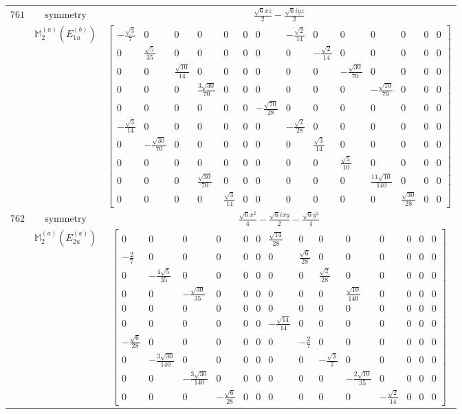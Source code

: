 \documentclass[fleqn,8pt,landscape]{jsarticle}
\begin{document}
\begin{longtable}{ccc}
$ 761 $ & $ \text{symmetry} $ & $ \frac{\sqrt{6} x z}{2} - \frac{\sqrt{6} i y z}{2} $ \\
$  $ & $ \mathbb{M}_{2}^{(a)}(E_{1u}^{(b)}) $ & $ \begin{bmatrix} - \frac{\sqrt{3}}{7} & 0 & 0 & 0 & 0 & 0 & 0 & - \frac{\sqrt{2}}{14} & 0 & 0 & 0 & 0 & 0 & 0 \\ 0 & \frac{\sqrt{5}}{35} & 0 & 0 & 0 & 0 & 0 & 0 & - \frac{\sqrt{2}}{14} & 0 & 0 & 0 & 0 & 0 \\ 0 & 0 & \frac{\sqrt{10}}{14} & 0 & 0 & 0 & 0 & 0 & 0 & - \frac{\sqrt{30}}{70} & 0 & 0 & 0 & 0 \\ 0 & 0 & 0 & \frac{3 \sqrt{30}}{70} & 0 & 0 & 0 & 0 & 0 & 0 & - \frac{\sqrt{10}}{70} & 0 & 0 & 0 \\ 0 & 0 & 0 & 0 & 0 & 0 & - \frac{\sqrt{70}}{28} & 0 & 0 & 0 & 0 & 0 & 0 & 0 \\ - \frac{\sqrt{3}}{14} & 0 & 0 & 0 & 0 & 0 & 0 & - \frac{\sqrt{2}}{28} & 0 & 0 & 0 & 0 & 0 & 0 \\ 0 & - \frac{\sqrt{30}}{70} & 0 & 0 & 0 & 0 & 0 & 0 & \frac{\sqrt{3}}{14} & 0 & 0 & 0 & 0 & 0 \\ 0 & 0 & 0 & 0 & 0 & 0 & 0 & 0 & 0 & \frac{\sqrt{5}}{10} & 0 & 0 & 0 & 0 \\ 0 & 0 & 0 & \frac{\sqrt{30}}{70} & 0 & 0 & 0 & 0 & 0 & 0 & \frac{11 \sqrt{10}}{140} & 0 & 0 & 0 \\ 0 & 0 & 0 & 0 & \frac{\sqrt{3}}{14} & 0 & 0 & 0 & 0 & 0 & 0 & \frac{\sqrt{30}}{28} & 0 & 0 \end{bmatrix} $ \\ \hline
$ 762 $ & $ \text{symmetry} $ & $ \frac{\sqrt{6} x^{2}}{4} - \frac{\sqrt{6} i x y}{2} - \frac{\sqrt{6} y^{2}}{4} $ \\
$  $ & $ \mathbb{M}_{2}^{(a)}(E_{2u}^{(a)}) $ & $ \begin{bmatrix} 0 & 0 & 0 & 0 & 0 & 0 & \frac{\sqrt{14}}{28} & 0 & 0 & 0 & 0 & 0 & 0 & 0 \\ - \frac{2}{7} & 0 & 0 & 0 & 0 & 0 & 0 & \frac{\sqrt{6}}{28} & 0 & 0 & 0 & 0 & 0 & 0 \\ 0 & - \frac{4 \sqrt{5}}{35} & 0 & 0 & 0 & 0 & 0 & 0 & \frac{\sqrt{2}}{28} & 0 & 0 & 0 & 0 & 0 \\ 0 & 0 & - \frac{\sqrt{30}}{35} & 0 & 0 & 0 & 0 & 0 & 0 & \frac{\sqrt{10}}{140} & 0 & 0 & 0 & 0 \\ 0 & 0 & 0 & 0 & 0 & 0 & 0 & 0 & 0 & 0 & 0 & 0 & 0 & 0 \\ 0 & 0 & 0 & 0 & 0 & 0 & - \frac{\sqrt{14}}{14} & 0 & 0 & 0 & 0 & 0 & 0 & 0 \\ - \frac{\sqrt{6}}{28} & 0 & 0 & 0 & 0 & 0 & 0 & - \frac{2}{7} & 0 & 0 & 0 & 0 & 0 & 0 \\ 0 & - \frac{3 \sqrt{30}}{140} & 0 & 0 & 0 & 0 & 0 & 0 & - \frac{\sqrt{3}}{7} & 0 & 0 & 0 & 0 & 0 \\ 0 & 0 & - \frac{3 \sqrt{30}}{140} & 0 & 0 & 0 & 0 & 0 & 0 & - \frac{2 \sqrt{10}}{35} & 0 & 0 & 0 & 0 \\ 0 & 0 & 0 & - \frac{\sqrt{6}}{28} & 0 & 0 & 0 & 0 & 0 & 0 & - \frac{\sqrt{2}}{14} & 0 & 0 & 0 \end{bmatrix} $ \\ \hline

\end{longtable}
\end{document}
